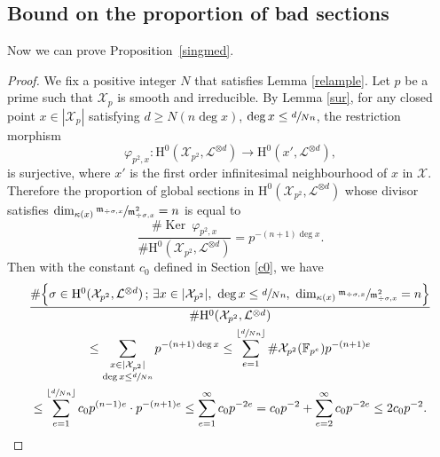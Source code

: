\documentclass[JEP,XML,SOM,Unicode,published]{cedram}
\newcommand{\sep}{\,;\,}
\theoremstyle{plain}
\theoremstyle{definition}
\newcommand{\ho}{\mathrm{H}}
\newcommand{\X}{\mathcal{X}}
\newcommand{\li}{\mathcal{L}}
\newcommand{\F}{\mathbb{F}}
\DeclareMathOperator{\Ker}{Ker}
\begin{document}
\subsection{Bound on the proportion of bad sections}
Now we can prove Proposition~\ref{singmed}.

\begin{proof}
We fix a positive integer $N$ that satisfies Lemma \ref{relample}. Let $p$ be a prime such that $\X_p$ is smooth and irreducible. By Lemma \ref{sur}, for any closed point $x\in |\X_{p}|$ satisfying $d\geq N(n\deg x)$, \ie $\deg x\leq \sfrac{d}{Nn}$, the restriction morphism
\[
\varphi_{p^2,x}: \ho^0(\X_{p^2}, \li^{\otimes d})\to \ho^0(x', \li^{\otimes d}),
\]
is surjective, where $x'$ is the first order infinitesimal neighbourhood of $x$ in $\X$. Therefore the proportion of global sections in $\ho^0(\X_{p^2}, \li^{\otimes d})$ whose divisor satisfies $\dim_{\kappa(x)}\sfrac{\mathfrak{m}_{\div \sigma,x}}{\mathfrak{m}_{\div \sigma,x}^2}=n$ is equal to
\[
\frac{\#\Ker\ \varphi_{p^2,x}}{\#\ho^0(\X_{p^2}, \li^{\otimes d})}=p^{-(n+1)\deg x}.
\]
Then with the constant $c_0$ defined in Section \ref{c0}, we have
\begin{multline*}
\frac{\#\Bigl\{ \sigma\in \ho^0(\X_{p^2}, \li^{\otimes d})\sep \exists x\in |\X_{p^2}|,\ \deg x\leq \sfrac{d}{Nn},\ \dim_{\kappa(x)}\sfrac{\mathfrak{m}_{\div \sigma,x}}{\mathfrak{m}_{\div \sigma,x}^2}=n \Bigr\} }{\#\ho^0(\X_{p^2}, \li^{\otimes d})}\\
\leq \sum_{\substack{x\in |\X_{p^2}|\\ \deg x\leq \sfrac{d}{Nn}}}p^{-(n+1)\deg x}\leq \sum_{e=1}^{\lfloor \sfrac{d}{Nn} \rfloor}\#\X_{p^2}(\F_{p^e}) p^{-(n+1)e} \\
\leq \sum_{e=1}^{\lfloor \sfrac{d}{Nn} \rfloor} c_0p^{(n-1)e}\cdot p^{-(n+1)e}
\leq \sum_{e=1}^{\infty} c_0 p^{-2e}= c_0p^{-2}+\sum_{e=2}^{\infty} c_0 p^{-2e}\leq 2c_0p^{-2}.
\end{multline*}


\end{proof}
\end{document}
